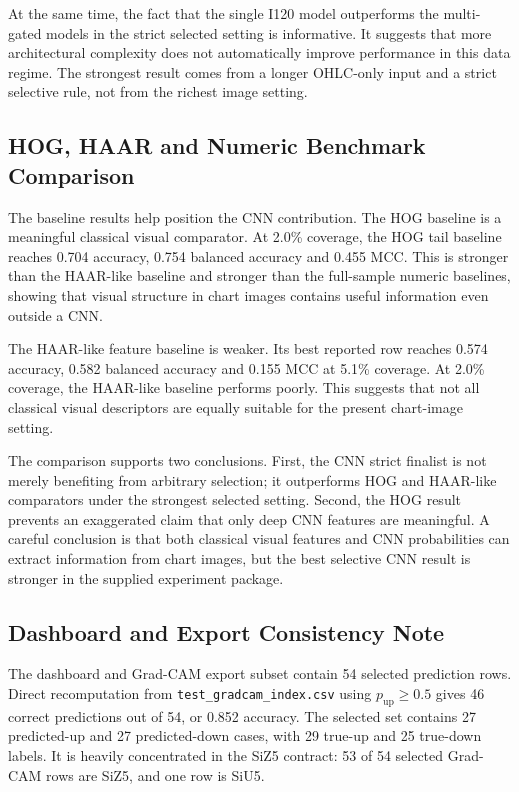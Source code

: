 At the same time, the fact that the single I120 model outperforms the multi-gated models in the strict selected setting is informative. It suggests that more architectural complexity does not automatically improve performance in this data regime. The strongest result comes from a longer OHLC-only input and a strict selective rule, not from the richest image setting.

\subsection{HOG, HAAR and Numeric Benchmark Comparison}
\label{subsec:baseline_results}





The baseline results help position the CNN contribution. The HOG baseline is a meaningful classical visual comparator. At 2.0\% coverage, the HOG tail baseline reaches 0.704 accuracy, 0.754 balanced accuracy and 0.455 MCC. This is stronger than the HAAR-like baseline and stronger than the full-sample numeric baselines, showing that visual structure in chart images contains useful information even outside a CNN.

The HAAR-like feature baseline is weaker. Its best reported row reaches 0.574 accuracy, 0.582 balanced accuracy and 0.155 MCC at 5.1\% coverage. At 2.0\% coverage, the HAAR-like baseline performs poorly. This suggests that not all classical visual descriptors are equally suitable for the present chart-image setting.

The comparison supports two conclusions. First, the CNN strict finalist is not merely benefiting from arbitrary selection; it outperforms HOG and HAAR-like comparators under the strongest selected setting. Second, the HOG result prevents an exaggerated claim that only deep CNN features are meaningful. A careful conclusion is that both classical visual features and CNN probabilities can extract information from chart images, but the best selective CNN result is stronger in the supplied experiment package.

\subsection{Dashboard and Export Consistency Note}
\label{subsec:dashboard_consistency}




The dashboard and Grad-CAM export subset contain 54 selected prediction rows. Direct recomputation from \texttt{test\_gradcam\_index.csv} using \(p_{\text{up}}\geq 0.5\) gives 46 correct predictions out of 54, or 0.852 accuracy. The selected set contains 27 predicted-up and 27 predicted-down cases, with 29 true-up and 25 true-down labels. It is heavily concentrated in the SiZ5 contract: 53 of 54 selected Grad-CAM rows are SiZ5, and one row is SiU5.

